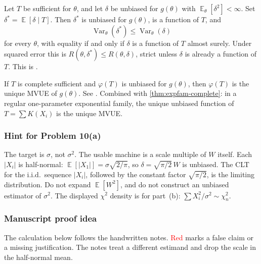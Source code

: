 \documentclass[11pt,a4paper]{article}
\newcommand{\mserr}[1]{\textcolor{red}{#1}}
\DeclareMathOperator{\Var}{Var}
\DeclareMathOperator{\E}{\mathbb{E}}
\begin{document}
\begin{theorem}
\label{thm:rao-blackwell}
Let \( T \) be sufficient for \( \theta \), and let \( \delta \) be unbiased for \( g(\theta) \) with \( \E_\theta[\delta^{2}]<\infty \). Set \( \delta^{*}= \E[\delta\mid T] \). Then \( \delta^{*} \) is unbiased for \( g(\theta) \), is a function of \( T \), and
\[
\Var_\theta(\delta^{*})
\le
\Var_\theta(\delta)
\]
for every \( \theta \), with equality if and only if \( \delta \) is a function of \( T \) almost surely. Under squared error this is \( R(\theta,\delta^{*})\le R(\theta,\delta) \), strict unless \( \delta \) is already a function of \( T \). This is \citep[Theorem~7.3.1]{hogg2019}.
\end{theorem}

\begin{theorem}
\label{thm:ls}
If \( T \) is complete sufficient and \( \varphi(T) \) is unbiased for \( g(\theta) \), then \( \varphi(T) \) is the unique MVUE of \( g(\theta) \). See \citep[Theorem~7.4.1]{hogg2019}. Combined with \cref{thm:expfam-complete}: in a regular one-parameter exponential family, the unique unbiased function of \( T=\sum K(X_i) \) is the unique MVUE.
\end{theorem}

\subsubsection{Hint for Problem 10(a)}

The target is \( \sigma \), not \( \sigma^{2} \). The usable machine is a scale multiple of \( W \) itself. Each \( |X_i| \) is half-normal: \( \E[|X_1|]=\sigma\sqrt{2/\pi} \), so \( \delta=\sqrt{\pi/2}\,W \) is unbiased. The CLT for the i.i.d.\ sequence \( |X_i| \), followed by the constant factor \( \sqrt{\pi/2} \), is the limiting distribution. Do not expand \( \E[W^{2}] \), and do not construct an unbiased estimator of \( \sigma^{2} \). The displayed \( \chi^{2} \) density is for part~(b): \( \sum X_i^{2}/\sigma^{2}\sim\chi^{2}_{n} \).

\subsubsection{Manuscript proof idea}

The calculation below follows the handwritten notes. \mserr{Red} marks a false claim or a missing justification. The notes treat a different estimand and drop the scale in the half-normal mean.
\end{document}
